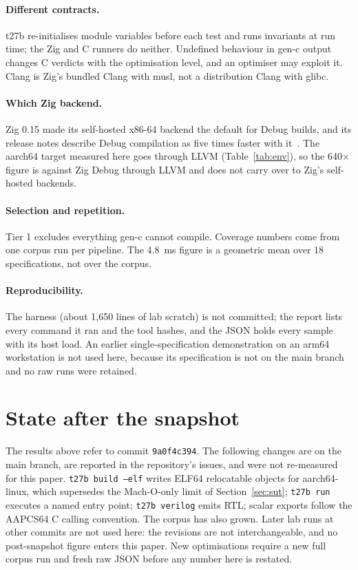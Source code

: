 \documentclass[11pt,a4paper]{article}
\begin{document}
\paragraph{Different contracts.}
t27b re-initialises module variables before each test and runs invariants
at run time; the Zig and C runners do neither. Undefined behaviour in
gen-c output changes C verdicts with the optimisation level, and an
optimiser may exploit it. Clang is Zig's bundled Clang with musl, not a
distribution Clang with glibc.

\paragraph{Which Zig backend.}
Zig 0.15 made its self-hosted x86-64 backend the default for Debug builds,
and its release notes describe Debug compilation as five times faster with
it~\cite{zig015}. The aarch64 target measured here goes through LLVM
(Table~\ref{tab:env}), so the 640$\times$ figure is against Zig Debug
through LLVM and does not carry over to Zig's self-hosted backends.

\paragraph{Selection and repetition.}
Tier 1 excludes everything gen-c cannot compile. Coverage numbers come
from one corpus run per pipeline. The 4.8~ms figure is a geometric mean
over 18 specifications, not over the corpus.

\paragraph{Reproducibility.}
The harness (about 1,650 lines of lab scratch) is not committed; the
report lists every command it ran and the tool hashes, and the JSON holds
every sample with its host load. An earlier single-specification
demonstration on an arm64 workstation is not used here, because its
specification is not on the main branch and no raw runs were retained.

\section{State after the snapshot}
\label{sec:after}

The results above refer to commit \texttt{9a0f4c394}. The following
changes are on the main branch, are reported in the repository's issues,
and were not re-measured for this paper. \texttt{t27b build --elf} writes
ELF64 relocatable objects for aarch64-linux, which supersedes the
Mach-O-only limit of Section~\ref{sec:sut}; \texttt{t27b run} executes a
named entry point; \texttt{t27b verilog} emits RTL; scalar exports follow
the AAPCS64 C calling convention. The corpus has also grown. Later lab
runs at other commits are not used here: the revisions are not
interchangeable, and no post-snapshot figure enters this paper. New optimisations require a
new full corpus run and fresh raw JSON before any number here is
restated.
\end{document}
